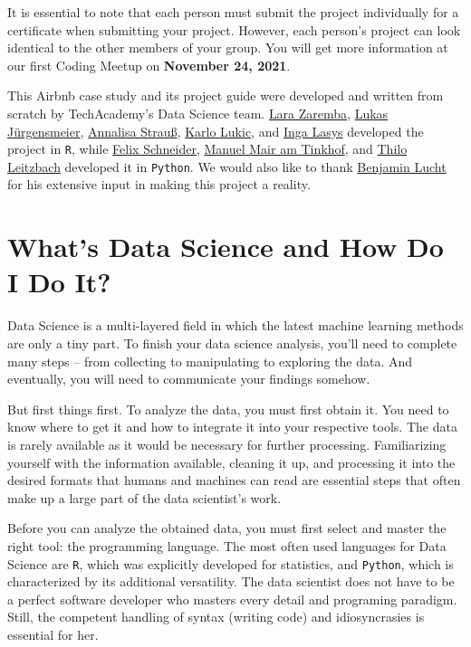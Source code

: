 \documentclass[
  11pt,
]{article}
\begin{document}
It is essential to note that each person must submit the project individually for a certificate when submitting your project.
However, each person's project can look identical to the other members of your group.
You will get more information at our first Coding Meetup on \textbf{November 24, 2021}.

This Airbnb case study and its project guide were developed and written from scratch by TechAcademy's Data Science team.
\href{linkedin.com/in/lara-zaremba}{Lara Zaremba}, \href{linkedin.com/in/lukas-juergensmeier}{Lukas Jürgensmeier}, \href{linkedin.com/in/annalisastrauss}{Annalisa Strauß}, \href{linkedin.com/in/karlo-lukic}{Karlo Lukic}, and \href{linkedin.com/in/inga-l-544713180}{Inga Lasys} developed the project in \texttt{R}, while \href{linkedin.com/in/flxschneider}{Felix Schneider}, \href{linkedin.com/in/manuel-mair-am-tinkhof-7b764111b}{Manuel Mair am Tinkhof}, and \href{linkedin.com/in/thilo-leitzbach}{Thilo Leitzbach} developed it in \texttt{Python}.
We would also like to thank \href{linkedin.com/in/benjamin-lucht}{Benjamin Lucht} for his extensive input in making this project a reality.

\hypertarget{whats-data-science-and-how-do-i-do-it}{%
\section{What's Data Science and How Do I Do It?}\label{whats-data-science-and-how-do-i-do-it}}

Data Science is a multi-layered field in which the latest machine learning methods are only a tiny part.
To finish your data science analysis, you'll need to complete many steps -- from collecting to manipulating to exploring the data.
And eventually, you will need to communicate your findings somehow.

But first things first.
To analyze the data, you must first obtain it.
You need to know where to get it and how to integrate it into your respective tools.
The data is rarely available as it would be necessary for further processing.
Familiarizing yourself with the information available, cleaning it up, and processing it into the desired formats that humans and machines can read are essential steps that often make up a large part of the data scientist's work.

Before you can analyze the obtained data, you must first select and master the right tool: the programming language.
The most often used languages for Data Science are \texttt{R}, which was explicitly developed for statistics, and \texttt{Python}, which is characterized by its additional versatility.
The data scientist does not have to be a perfect software developer who masters every detail and programing paradigm.
Still, the competent handling of syntax (writing code) and idiosyncrasies is essential for her.
\end{document}
